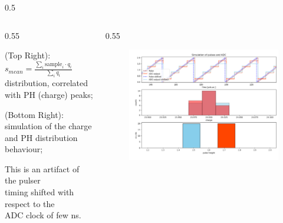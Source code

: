 \documentclass{beamer}
\begin{document}
\begin{frame}
\begin{columns}
\begin{column}{0.5\framewidth}
\begin{figure}[!h]
     \label{fig:normalhits}
\end{figure}
\end{column}
\end{columns}
\vspace{-5mm}
    \begin{columns}
    \begin{column}{0.55\framewidth}
        \setlength{\leftmargini}{1.em}
      \begin{itemize}
 {\footnotesize
\item (Top Right): $s_{mean} = \frac{\sum_i \text{sample}_i \cdot q_i }{\sum_i q_i} $ distribution, correlated with PH (charge) peaks;
\item (Bottom Right): simulation of the charge and PH distribution \\ behaviour;
\item This is an artifact of the pulser \\
timing shifted with respect to the \\ ADC 
clock of few ns.}

\end{itemize}
\end{column}
\begin{column}{0.55\framewidth}
         \begin{figure}[!h]
      \centering
      \hspace*{-2em}
      \includegraphics[width=1.05\columnwidth]{figures/png/pres.png}
     \label{fig:normalhits}
\end{figure}
\end{column}
\end{columns}
\end{frame}
\end{document}
